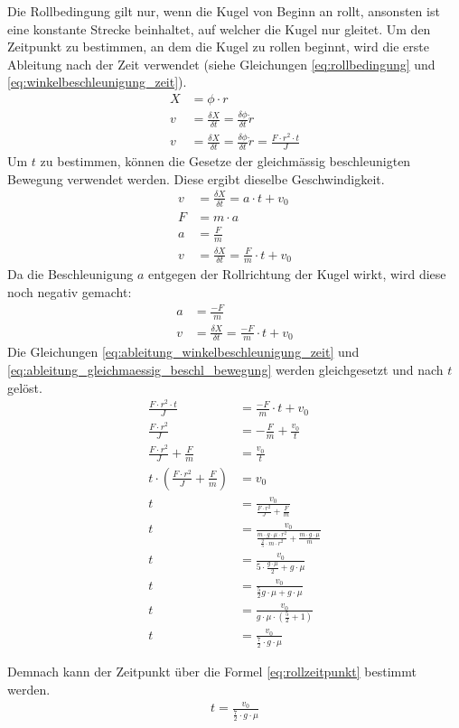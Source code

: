 Die Rollbedingung gilt nur, wenn die Kugel von Beginn an rollt, ansonsten ist eine konstante Strecke beinhaltet,
auf welcher die Kugel nur gleitet\cite{rollzeitpunkt}. Um den Zeitpunkt zu bestimmen, an dem die Kugel zu rollen
beginnt, wird die erste Ableitung nach der Zeit verwendet (siehe Gleichungen \ref{eq:rollbedingung} und \ref{eq:winkelbeschleunigung_zeit}).
\begin{align}
    X &= \phi \cdot r\\
    v &= \frac{\delta X}{\delta t} = \frac{\delta \phi}{\delta t} \dot r\\
    v &= \frac{\delta X}{\delta t} = \frac{\delta \phi}{\delta t} \dot r = \frac{F \cdot r^2 \cdot t}{J}\label{eq:ableitung_winkelbeschleunigung_zeit}
\end{align}
Um $t$ zu bestimmen, können die Gesetze der gleichmässig beschleunigten Bewegung verwendet werden. Diese ergibt dieselbe Geschwindigkeit.
\begin{align}
    v &= \frac{\delta X}{\delta t} = a \cdot t + v_0\\
    F &= m \cdot a\\
    a &= \frac{F}{m}\\
    v &= \frac{\delta X}{\delta t} = \frac{F}{m} \cdot t + v_0
\end{align}
Da die Beschleunigung $a$ entgegen der Rollrichtung der Kugel wirkt, wird diese noch negativ gemacht:
\begin{align}
    a &= \frac{-F}{m}\\
    v &= \frac{\delta X}{\delta t} = \frac{-F}{m} \cdot t + v_0\label{eq:ableitung_gleichmaessig_beschl_bewegung}
\end{align}
Die Gleichungen \ref{eq:ableitung_winkelbeschleunigung_zeit} und \ref{eq:ableitung_gleichmaessig_beschl_bewegung} werden gleichgesetzt und nach $t$ gelöst.
\begin{align}
    \frac{F \cdot r^2 \cdot t}{J} &= \frac{-F}{m} \cdot t + v_0\\
    \frac{F \cdot r^2}{J} &= -\frac{F}{m} + \frac{v_0}{t}\\
    \frac{F \cdot r^2}{J} + \frac{F}{m} &= \frac{v_0}{t}\\
    t \cdot (\frac{F \cdot r^2}{J} + \frac{F}{m}) &= v_0\\
    t &= \frac{v_0}{\frac{F \cdot r^2}{J} + \frac{F}{m}}\\
    t &= \frac{v_0}{\frac{m \cdot g \cdot \mu \cdot r^2}{\frac{2}{5} \cdot m \cdot r^2} + \frac{m \cdot g \cdot \mu}{m}}\\
    t &= \frac{v_0}{5 \cdot \frac{g \cdot \mu}{2} + g \cdot \mu}\\
    t &= \frac{v_0}{\frac{5}{2} g \cdot \mu + g \cdot \mu}\\
    t &= \frac{v_0}{g \cdot \mu \cdot (\frac{5}{2} + 1)}\\
    t &= \frac{v_0}{\frac{7}{2} \cdot g \cdot \mu}
\end{align}

Demnach kann der Zeitpunkt über die Formel \ref{eq:rollzeitpunkt} bestimmt werden.
\begin{align}
    t = \frac{v_0}{\frac{7}{2} \cdot g \cdot \mu}\label{eq:rollzeitpunkt}
\end{align}